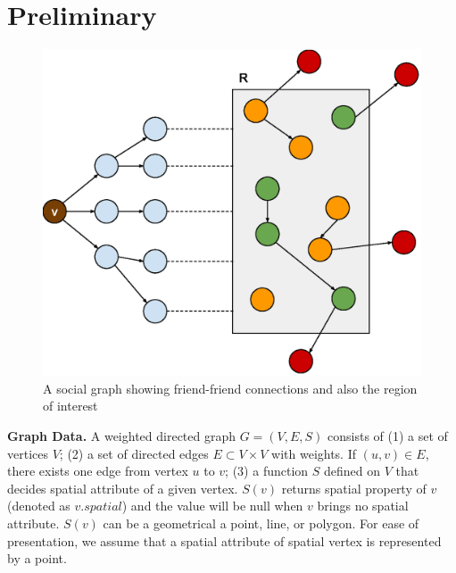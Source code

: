\section{Preliminary}
\label{sec:preliminary}

\begin{figure}[h]
	\centering
	\includegraphics[width=0.5\linewidth]{images/image10.eps}
	\caption{A social graph showing friend-friend connections and also
		the region of interest}
	\label{fig:socio-spatial-graph}
\end{figure}

{\bf Graph Data.} A weighted directed graph $G=(V,E,S)$ consists of (1) a set of vertices $V$; (2) a set of directed edges $E\subset V\times V$ with weights. If $(u,v)\in E$, there exists one edge from vertex $u$ to $v$; (3) a function $S$ defined on $V$ that decides spatial attribute of a given vertex. $S(v)$ returns spatial property of $v$ (denoted as $v.spatial$) and the value will be null when $v$ brings no spatial attribute. $S(v)$ can be a geometrical a point, line, or polygon. For ease of presentation, we assume that a spatial attribute of spatial vertex is represented by a point.



